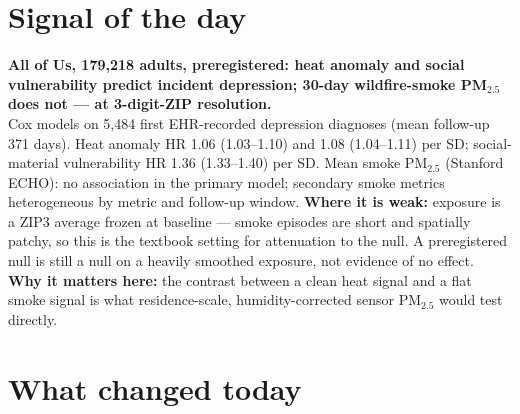 \documentclass[10pt]{article}
\begin{document}
\vspace{6mm}

\section*{\sffamily\bfseries\color{Deep}Signal of the day}
\vspace{-1.5mm}{\color{Amber}\rule{\linewidth}{1.1pt}}\vspace{2.5mm}

\begin{keybox}
{\sffamily\bfseries\small\color{Deep}All of Us, 179,218 adults, preregistered: heat anomaly and social
vulnerability predict incident depression; 30-day wildfire-smoke PM$_{2.5}$ does not --- at 3-digit-ZIP resolution.}\\[1.4mm]
\footnotesize
Cox models on 5,484 first EHR-recorded depression diagnoses (mean follow-up 371 days). Heat anomaly HR 1.06 (1.03--1.10)
and 1.08 (1.04--1.11) per SD; social-material vulnerability HR 1.36 (1.33--1.40) per SD. Mean smoke PM$_{2.5}$ (Stanford
ECHO): no association in the primary model; secondary smoke metrics heterogeneous by metric and follow-up window.
\textbf{Where it is weak:} exposure is a ZIP3 average frozen at baseline --- smoke episodes are short and spatially
patchy, so this is the textbook setting for attenuation to the null. A preregistered null is still a null on a
heavily smoothed exposure, not evidence of no effect.
\textbf{Why it matters here:} the contrast between a clean heat signal and a flat smoke signal is what residence-scale,
humidity-corrected sensor PM$_{2.5}$ would test directly.\par
\end{keybox}

\vspace{3mm}

\section*{\sffamily\bfseries\color{Deep}What changed today}
\vspace{-1.5mm}{\color{Amber}\rule{\linewidth}{1.1pt}}\vspace{2.5mm}
\end{document}
